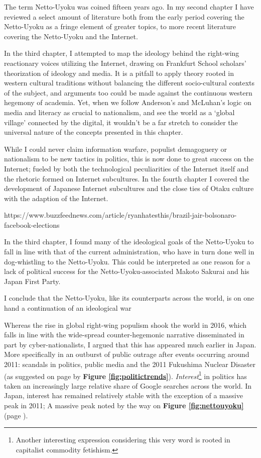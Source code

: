 \documentclass[10pt,british,A4paper,,openany]{memoir}
\begin{document}
The term Netto-Uyoku was coined fifteen years ago. In my second chapter
I have reviewed a select amount of literature both from the early period
covering the Netto-Uyoku as a fringe element of greater topics, to more
recent literature covering the Netto-Uyoku and the Internet.

In the third chapter, I attempted to map the ideology behind the
right-wing reactionary voices utilizing the Internet, drawing on
Frankfurt School scholars' theorization of ideology and media. It is a
pitfall to apply theory rooted in western cultural traditions without
balancing the different socio-cultural contexts of the subject, and
arguments too could be made against the continuous western hegemony of
academia. Yet, when we follow Anderson's and McLuhan's logic on media
and literacy as crucial to nationalism, and see the world as a `global
village' connected by the digital, it wouldn't be a far stretch to
consider the universal nature of the concepts presented in this chapter.

While I could never claim information warfare, populist demagoguery or
nationalism to be new tactics in politics, this is now done to great
success on the Internet; fueled by both the technological peculiarities
of the Internet itself and the rhetoric formed on Internet subcultures.
In the fourth chapter I covered the development of Japanese Internet
subcultures and the close ties of Otaku culture with the adaption of the
Internet.

https://www.buzzfeednews.com/article/ryanhatesthis/brazil-jair-bolsonaro-facebook-elections

In the third chapter, I found many of the ideological goals of the
Netto-Uyoku to fall in line with that of the current administration, who
have in turn done well in dog-whistling to the Netto-Uyoku. This could
be interpreted as one reason for a lack of political success for the
Netto-Uyoku-associated Makoto Sakurai and his Japan First Party.

I conclude that the Netto-Uyoku, like its counterparts across the world,
is on one hand a continuation of an ideological war

Whereas the rise in global right-wing populism shook the world in 2016,
which falls in line with the wide-spread counter-hegemonic narrative
disseminated in part by cyber-nationalists, I argued that this has
appeared much earlier in Japan. More specifically in an outburst of
public outrage after events occurring around 2011: scandals in politics,
public media and the 2011 Fukushima Nuclear Disaster (as suggested on
page \pageref{populism-gt} by \textbf{Figure \ref{fig:politictrends}}).
\emph{Interest}\footnote{Another interesting expression considering this
  very word is rooted in capitalist commodity fetishism.} in politics
has taken an increasingly large relative share of Google searches across
the world. In Japan, interest has remained relatively stable with the
exception of a massive peak in 2011; A massive peak noted by the way on
\textbf{Figure \ref{fig:nettouyoku}} (page \pageref{nettouyoku-gt}).
\end{document}
